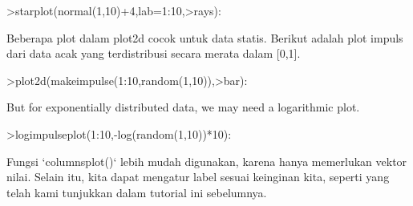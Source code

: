 \documentclass[12pt,arial,letterpaper]{book}
\begin{document}
\begin{eulercomment}
\begin{eulercomment}
\begin{eulercomment}
\begin{eulercomment}
\begin{eulercomment}
\begin{eulercomment}
\begin{eulercomment}
\begin{eulercomment}
\begin{eulercomment}
\begin{eulercomment}
\begin{eulercomment}
\begin{eulercomment}
\begin{eulercomment}
\begin{eulercomment}
\begin{eulercomment}
\begin{eulercomment}
\begin{eulercomment}
\begin{eulercomment}
\begin{eulercomment}
\begin{eulercomment}
\begin{eulercomment}
\begin{eulercomment}
\begin{eulercomment}
\begin{eulercomment}
\begin{eulercomment}
\begin{eulercomment}
\begin{eulercomment}
\begin{eulercomment}
\begin{eulercomment}
\begin{eulercomment}
\begin{eulercomment}
\begin{eulercomment}
\begin{eulercomment}
\end{eulercomment}
\begin{eulerprompt}
>starplot(normal(1,10)+4,lab=1:10,>rays):
\end{eulerprompt}
\begin{eulercomment}
Beberapa plot dalam plot2d cocok untuk data statis. Berikut adalah
plot impuls dari data acak yang terdistribusi secara merata dalam
[0,1].
\end{eulercomment}
\begin{eulerprompt}
>plot2d(makeimpulse(1:10,random(1,10)),>bar):
\end{eulerprompt}
\begin{eulercomment}
But for exponentially distributed data, we may need a logarithmic plot.
\end{eulercomment}
\begin{eulerprompt}
>logimpulseplot(1:10,-log(random(1,10))*10):
\end{eulerprompt}
\begin{eulercomment}
Fungsi `columnsplot()` lebih mudah digunakan, karena hanya memerlukan
vektor nilai. Selain itu, kita dapat mengatur label sesuai keinginan
kita, seperti yang telah kami tunjukkan dalam tutorial ini sebelumnya.


\end{eulercomment}
\end{eulercomment}
\end{eulercomment}
\end{eulercomment}
\end{eulercomment}
\end{eulercomment}
\end{eulercomment}
\end{eulercomment}
\end{eulercomment}
\end{eulercomment}
\end{eulercomment}
\end{eulercomment}
\end{eulercomment}
\end{eulercomment}
\end{eulercomment}
\end{eulercomment}
\end{eulercomment}
\end{eulercomment}
\end{eulercomment}
\end{eulercomment}
\end{eulercomment}
\end{eulercomment}
\end{eulercomment}
\end{eulercomment}
\end{eulercomment}
\end{eulercomment}
\end{eulercomment}
\end{eulercomment}
\end{eulercomment}
\end{eulercomment}
\end{eulercomment}
\end{eulercomment}
\end{eulercomment}
\end{document}
